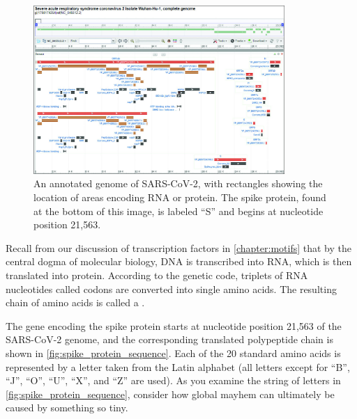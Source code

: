\begin{figure}[h]
	\centering
	\mySfFamily
	\includegraphics[width = 0.85\textwidth]{../images_CMYK/SARSCoV2Annotation}
	\caption{An annotated genome of SARS-CoV-2, with rectangles showing the location of areas encoding RNA or protein. The spike protein, found at the bottom of this image, is labeled ``S'' and begins at nucleotide position 21,563.}
	\label{fig:SARSCoV2Annotation}
\end{figure}

Recall from our discussion of transcription factors in \autoref{chapter:motifs} that by the central dogma of molecular biology, DNA is transcribed into RNA, which is then translated into protein. According to the genetic code, triplets of RNA nucleotides called codons are converted into single amino acids. The resulting chain of amino acids is called a .\\

\begin{note}\end{note}

The gene encoding the spike protein starts at nucleotide position 21,563 of the SARS-CoV-2 genome, and the corresponding translated polypeptide chain is shown in \autoref{fig:spike_protein_sequence}. Each of the 20 standard amino acids is represented by a letter taken from the Latin alphabet (all letters except for ``B'', ``J'', ``O'', ``U'', ``X'', and ``Z'' are used). As you examine the string of letters in \autoref{fig:spike_protein_sequence}, consider how global mayhem can ultimately be caused by something so tiny.

